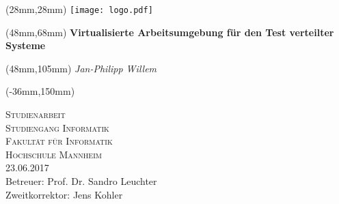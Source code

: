 %
% 
%
 
\begin{titlepage}
\begin{textblock*}{130mm}(28mm,28mm) 
{\texttt{[image: logo.pdf]}}
\end{textblock*}%
\begin{textblock*}{130mm}(48mm,68mm) %
	\centering\huge\bfseries
	Virtualisierte Arbeitsumgebung für den Test verteilter Systeme
\end{textblock*}%

\begin{textblock*}{130mm}(48mm,105mm)
	\centering\Large\itshape 
	Jan-Philipp Willem
\end{textblock*}

\begin{textblock*}{297mm}(-36mm,150mm) %
	\begin{center}
		{\scshape\Large Studienarbeit\\ Studiengang Informatik}\\
		\vspace{2cm}
		{\scshape\large Fakultät für Informatik\\Hochschule Mannheim}\\
		\vspace{2cm}
		{\large 23.06.2017} \\ %
		\vspace{3,5cm}
		{\large Betreuer: Prof. Dr. Sandro Leuchter\\
		Zweitkorrektor: Jens Kohler}
	\end{center}
\end{textblock*}
\end{titlepage}
\null
\newpage
